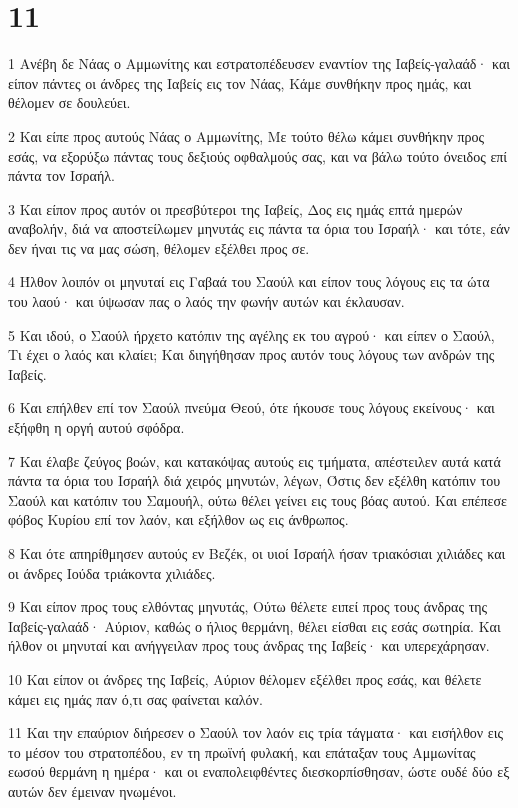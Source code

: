 \chapter{11}

\par 1 Ανέβη δε Νάας ο Αμμωνίτης και εστρατοπέδευσεν εναντίον της Ιαβείς-γαλαάδ· και είπον πάντες οι άνδρες της Ιαβείς εις τον Νάας, Κάμε συνθήκην προς ημάς, και θέλομεν σε δουλεύει.
\par 2 Και είπε προς αυτούς Νάας ο Αμμωνίτης, Με τούτο θέλω κάμει συνθήκην προς εσάς, να εξορύξω πάντας τους δεξιούς οφθαλμούς σας, και να βάλω τούτο όνειδος επί πάντα τον Ισραήλ.
\par 3 Και είπον προς αυτόν οι πρεσβύτεροι της Ιαβείς, Δος εις ημάς επτά ημερών αναβολήν, διά να αποστείλωμεν μηνυτάς εις πάντα τα όρια του Ισραήλ· και τότε, εάν δεν ήναι τις να μας σώση, θέλομεν εξέλθει προς σε.
\par 4 Ήλθον λοιπόν οι μηνυταί εις Γαβαά του Σαούλ και είπον τους λόγους εις τα ώτα του λαού· και ύψωσαν πας ο λαός την φωνήν αυτών και έκλαυσαν.
\par 5 Και ιδού, ο Σαούλ ήρχετο κατόπιν της αγέλης εκ του αγρού· και είπεν ο Σαούλ, Τι έχει ο λαός και κλαίει; Και διηγήθησαν προς αυτόν τους λόγους των ανδρών της Ιαβείς.
\par 6 Και επήλθεν επί τον Σαούλ πνεύμα Θεού, ότε ήκουσε τους λόγους εκείνους· και εξήφθη η οργή αυτού σφόδρα.
\par 7 Και έλαβε ζεύγος βοών, και κατακόψας αυτούς εις τμήματα, απέστειλεν αυτά κατά πάντα τα όρια του Ισραήλ διά χειρός μηνυτών, λέγων, Όστις δεν εξέλθη κατόπιν του Σαούλ και κατόπιν του Σαμουήλ, ούτω θέλει γείνει εις τους βόας αυτού. Και επέπεσε φόβος Κυρίου επί τον λαόν, και εξήλθον ως εις άνθρωπος.
\par 8 Και ότε απηρίθμησεν αυτούς εν Βεζέκ, οι υιοί Ισραήλ ήσαν τριακόσιαι χιλιάδες και οι άνδρες Ιούδα τριάκοντα χιλιάδες.
\par 9 Και είπον προς τους ελθόντας μηνυτάς, Ούτω θέλετε ειπεί προς τους άνδρας της Ιαβείς-γαλαάδ· Αύριον, καθώς ο ήλιος θερμάνη, θέλει είσθαι εις εσάς σωτηρία. Και ήλθον οι μηνυταί και ανήγγειλαν προς τους άνδρας της Ιαβείς· και υπερεχάρησαν.
\par 10 Και είπον οι άνδρες της Ιαβείς, Αύριον θέλομεν εξέλθει προς εσάς, και θέλετε κάμει εις ημάς παν ό,τι σας φαίνεται καλόν.
\par 11 Και την επαύριον διήρεσεν ο Σαούλ τον λαόν εις τρία τάγματα· και εισήλθον εις το μέσον του στρατοπέδου, εν τη πρωϊνή φυλακή, και επάταξαν τους Αμμωνίτας εωσού θερμάνη η ημέρα· και οι εναπολειφθέντες διεσκορπίσθησαν, ώστε ουδέ δύο εξ αυτών δεν έμειναν ηνωμένοι.
